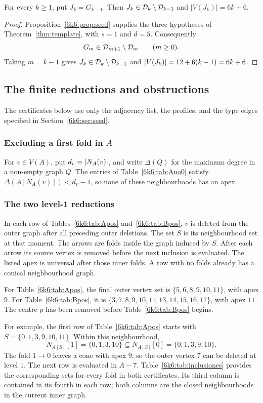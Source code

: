 \begin{theorem}\label{6k6:thm:family}
For every $k\geq1$, put $J_k=G_{k-1}$. Then $J_k\in\mathcal D_k\setminus\mathcal D_{k-1}$ and $|V(J_k)|=6k+6$.
\end{theorem}
\begin{proof}
Proposition~\ref{6k6:prop:seed} supplies the three hypotheses of
Theorem~\ref{thm:template}, with \(s=1\) and \(d=5\). Consequently
\[
 G_m\in\mathcal D_{m+1}\setminus\mathcal D_m\qquad(m\geq0).
\]
Taking \(m=k-1\) gives \(J_k\in\mathcal D_k\setminus\mathcal D_{k-1}\) and
\(\lvert V(J_k)\rvert=12+6(k-1)=6k+6\).
\end{proof}

\subsection{The finite reductions and obstructions}\label{6k6:app:certificates}
The certificates below use only the adjacency list, the profiles,
and the type edges specified in Section~\ref{6k6:sec:seed}.

\subsubsection{Excluding a first fold in \texorpdfstring{\(A\)}{A}}
For \(v\in V(A)\), put \(d_v=\lvert N_A(v)\rvert\), and write
\(\Delta(Q)\) for the maximum degree in a non-empty graph \(Q\).
The entries of Table~\ref{6k6:tab:Ano0} satisfy
\(\Delta(A[N_A(v)])<d_v-1\), so none of these neighbourhoods
has an apex.


\subsubsection{The two level-1 reductions}
In each row of Tables~\ref{6k6:tab:Apos} and~\ref{6k6:tab:Bpos}, \(v\) is
deleted from the outer graph after all preceding outer deletions.
The set \(S\) is its neighbourhood set at that moment.
The arrows are folds inside the graph induced by \(S\).
After each arrow its source vertex is removed before the next
inclusion is evaluated. The listed apex is universal after
those inner folds. A row with no folds already has a conical
neighbourhood graph.

For Table~\ref{6k6:tab:Apos}, the final outer vertex set is
\(\{5,6,8,9,10,11\}\), with apex \(9\).
For Table~\ref{6k6:tab:Bpos}, it is
\(\{3,7,8,9,10,11,13,14,15,16,17\}\), with apex \(11\).
The centre \(p\) has been removed before Table~\ref{6k6:tab:Bpos}
begins.


For example, the first row of Table~\ref{6k6:tab:Apos} starts with
\(S=\{0,1,3,9,10,11\}\). Within this neighbourhood,
\[
 N_{A[S]}[1]=\{0,1,3,10\}\subseteq
 N_{A[S]}[0]=\{0,1,3,9,10\}.
\]
The fold \(1\to0\) leaves a cone with apex \(9\), so the outer
vertex \(7\) can be deleted at level \(1\).
The next row is evaluated in \(A-7\).
Table~\ref{6k6:tab:inclusiones} provides the corresponding sets for
every fold in both certificates. Its third column is contained
in its fourth in each row; both columns are the closed
neighbourhoods in the current inner graph.


